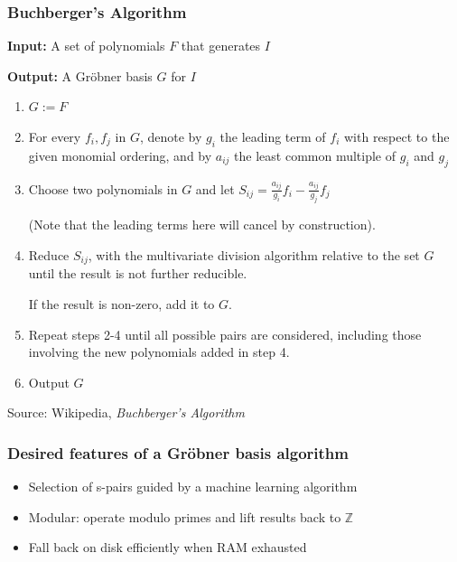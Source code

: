 \documentclass{beamer}
\begin{document}
\begin{frame}
\frametitle{Buchberger's Algorithm}

{\bf Input:} A set of polynomials $F$ that generates $I$

{\bf Output:} A Gröbner basis $G$ for $I$

\begin{enumerate}
\item $G := F$
\item For every $f_i,f_j$ in $G$, denote by $g_i$ the leading term of $f_i$ with respect to the given monomial ordering,
and by $a_{ij}$ the least common multiple of $g_i$ and $g_j$
\item Choose two polynomials in $G$ and let $S_{ij}=\frac{a_{ij}}{g_i}f_i  - \frac{a_{ij}}{g_j}f_j $

(Note that the leading terms here will cancel by construction).
\item Reduce $S_{ij}$, with the multivariate division algorithm relative to the set $G$ until the result is not further reducible.

If the result is non-zero, add it to $G$.
\item Repeat steps 2-4 until all possible pairs are considered, including those involving the new polynomials added in step 4.
\item Output $G$
\end{enumerate}

Source: Wikipedia, {\it Buchberger's Algorithm}
\end{frame}

\begin{frame}
\frametitle{Desired features of a Gr\"obner basis algorithm}
\begin{itemize}
\item Selection of s-pairs guided by a machine learning algorithm
\item Modular: operate modulo primes and lift results back to $\mathbb Z$
\item Fall back on disk efficiently when RAM exhausted
\end{itemize}
\end{frame}
\end{document}
